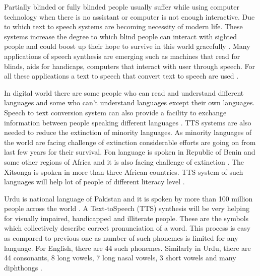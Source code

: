 Partially blinded or fully blinded people usually suffer while using computer technology when there is no assistant or computer is not enough interactive. Due to which text to speech systems are becoming necessity of modern life. These systems increase the degree to which blind people can interact with sighted people \cite{klatt1987review} and could boost up their hope to survive in this world gracefully \cite{aida2010main}. Many applications of speech synthesis are emerging such as machines that read for blinds, aids for handicaps, computers that interact with user through speech. For all these applications a text to
speech that convert text to speech are used \cite{klatt1982klattalk}.


In digital world there are some people who can read and understand different languages and some
who can’t understand languages except their own languages. Speech to text conversion system can
also provide a facility to exchange information between people speaking different languages \cite{khilari2015review}. TTS systems are also needed to reduce the extinction of
minority languages. As minority languages of the world are facing challenge of extinction
considerable efforts are going on from last few years for their survival. Fon language is spoken in
Republic of Benin and some other regions of Africa and it is also facing challenge of extinction \cite{dagba2014text}. The Xitsonga is spoken in more than three African countries.
TTS system of such languages will help lot of people of different literacy level \cite{baloyi2012text}.

Urdu is national language of Pakistan and it is spoken by more than 100 million people across the world \cite{top_30_languages}.
A Text-toSpeech (TTS) synthesis will be very helping for visually impaired, handicapped and illiterate people. These are the symbols which
collectively describe correct pronunciation of a word. This process is easy as compared to previous one
as number of such phonemes is limited for any language. For English, there are 44 such phonemes.
Similarly in Urdu, there are 44 consonants, 8 long vowels, 7 long nasal vowels, 3 short vowels and many
diphthongs \cite{saleem2002urdu}.

